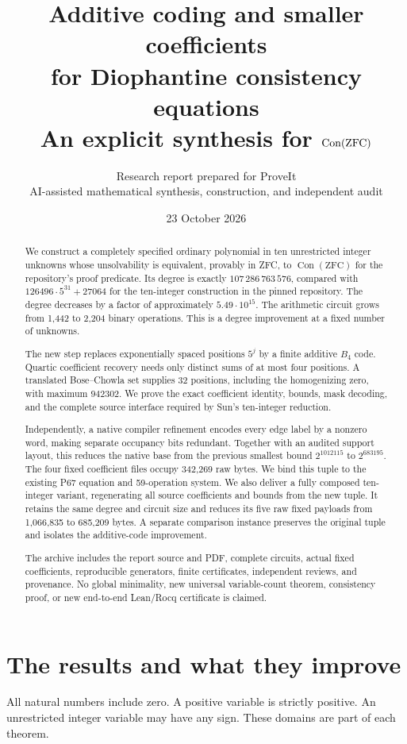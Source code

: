 \documentclass[11pt,a4paper]{article}
\title{\textbf{Additive coding and smaller coefficients\\for Diophantine consistency equations}\\[4pt]
\large An explicit synthesis for $\Con(\mathrm{ZFC})$}
\author{Research report prepared for ProveIt\\
\small AI-assisted mathematical synthesis, construction, and independent audit}
\date{23 October 2026}
\theoremstyle{definition}
\newcommand{\Con}{\operatorname{Con}}
\begin{document}
\maketitle
\begin{abstract}
We construct a completely specified ordinary polynomial in ten unrestricted
integer unknowns whose unsolvability is equivalent, provably in ZFC, to
$\Con(\mathrm{ZFC})$ for the repository's proof predicate. Its degree is
exactly $107\,286\,763\,576$, compared with
$126496\cdot5^{31}+27064$ for the ten-integer construction in the pinned
repository. The degree decreases by a factor of approximately
$5.49\cdot10^{15}$. The arithmetic circuit grows from 1,442 to 2,204 binary
operations. This is a degree improvement at a fixed number of unknowns.

The new step replaces exponentially spaced positions $5^j$ by a finite
additive $B_4$ code. Quartic coefficient recovery needs only distinct
sums of at most four positions. A translated Bose--Chowla set supplies
32 positions, including the homogenizing zero, with maximum $942302$.
We prove the exact coefficient identity, bounds, mask decoding, and
the complete source interface required by Sun's ten-integer reduction.

Independently, a native compiler refinement encodes every edge label
by a nonzero word, making separate occupancy bits redundant. Together
with an audited support layout, this reduces the native base from the
previous smallest bound $2^{1012115}$ to $2^{683195}$. The four fixed
coefficient files occupy 342,269 raw bytes. We bind this tuple to the
existing P67 equation and 59-operation system. We also deliver a
fully composed ten-integer variant, regenerating all source coefficients
and bounds from the new tuple. It retains the same degree and circuit
size and reduces its five raw fixed payloads from 1,066,835 to
685,209 bytes. A separate comparison instance preserves the original
tuple and isolates the additive-code improvement.

The archive includes the report source and PDF, complete circuits,
actual fixed coefficients, reproducible generators, finite
certificates, independent reviews, and provenance. No global
minimality, new universal variable-count theorem, consistency proof,
or new end-to-end Lean/Rocq certificate is claimed.
\end{abstract}
\clearpage
\tableofcontents
\newpage

\section{The results and what they improve}
\label{sec:result}
All natural numbers include zero. A positive variable is strictly
positive. An unrestricted integer variable may have any sign.
These domains are part of each theorem.
\end{document}
